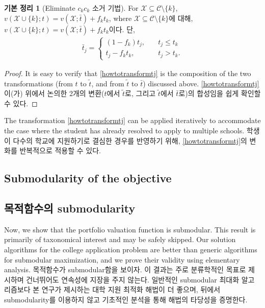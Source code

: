 \documentclass[11pt]{article} %
\newtheorem{lemma}{Lemma}
\theoremstyle{definition}
\newtheorem{lemma}{기본 정리}
\theoremstyle{definition}
\begin{document}
\begin{lemma}[\ifen Eliminate $c_k$\else $c_k$ 소거 기법\fi] \label{eliminationtheorem}
\ifen For $\mathcal{X} \subseteq \mathcal{C} \setminus \{k\}$, $v(\mathcal{X}\cup\{k\}; t)  = v(\mathcal{X}; \bar t) + f_k t_k$, where
\else $\mathcal{X} \subseteq \mathcal{C} \setminus \{k\}$에 대해, $v(\mathcal{X}\cup\{k\}; t)  = v(\mathcal{X}; \bar t) + f_k t_k$이다. 단,\fi
\begin{align}\label{howtotransformtj}
\bar t_j = 
\begin{cases}
(1 - f_k) t_j, \quad & t_j \leq t_k \\
t_j - f_k t_k, \quad& t_j > t_k.
\end{cases}
\end{align}
\end{lemma}

\begin{proof}
\ifen It is easy to verify that \eqref{howtotransformtj} is the composition of the two transformations (from $t$ to $\tilde t$, and from $\tilde t$ to $\bar t$) discussed above.
\else \eqref{howtotransformtj}이(가) 위에서 논의한 2개의 변환($t$에서 $\tilde t$로, 그리고 $\tilde t$에서 $\bar t$로)의 합성임을 쉽게 확인할 수 있다. \fi
\end{proof}

\ifen
\noindent The transformation \eqref{howtotransformtj} can be applied iteratively to accommodate the case where the student has already resolved to apply to multiple schools.
\else
\noindent 학생이 다수의 학교에 지원하기로 결심한 경우를 반영하기 위해, \eqref{howtotransformtj}의 변화를 반복적으로 적용할 수 있다.
\fi


\ifen \subsection{Submodularity of the objective} \else \subsection{목적함수의 submodularity} \fi
\ifen 
Now, we show that the portfolio valuation function is submodular. This result is primarily of taxonomical interest and may be safely skipped. Our solution algorithms for the college application problem are better than generic algorithms for submodular maximization, and we prove their validity using elementary analysis.
\else
목적함수가 submodular함을 보이자. 이 결과는 주로 분류학적인 목표로 제시하며 건너뛰어도 연속성에 지장을 주지 않는다. 일반적인 submodular 최대화 알고리즘보다 본 연구가 제시하는 대학 지원 최적화 해법이 더 좋으며, 뒤에서 submodularity를 이용하지 않고 기초적인 분석을 통해 해법의 타당성을 증명한다.
\fi
\end{document}
